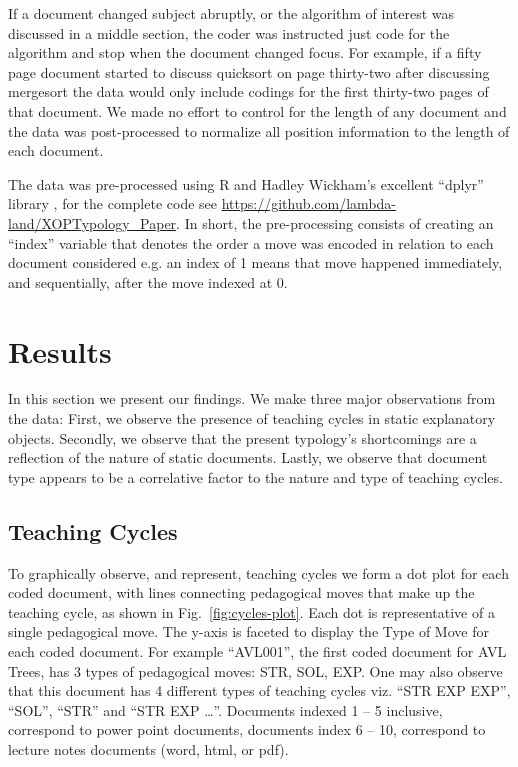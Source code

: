 \documentclass[conference]{IEEEtran}
\begin{document}
If a document changed subject abruptly, or the algorithm of interest was
discussed in a middle section, the coder was instructed just code for the
algorithm and stop when the document changed focus. For example, if a fifty page
document started to discuss quicksort on page thirty-two after discussing
mergesort the data would only include codings for the first thirty-two pages of
that document. We made no effort to control for the length of any document and
the data was post-processed to normalize all position information to the
length of each document.

The data was pre-processed using R and Hadley Wickham's excellent ``dplyr''
library \cite{Dplyr}, for the complete code see
\url{https://github.com/lambda-land/XOPTypology_Paper}. In short, the
pre-processing consists of creating an ``index'' variable that denotes the order
a move was encoded in relation to each document considered e.g. an index of 1
means that move happened immediately, and sequentially, after the move indexed
at 0.


\section{Results}

In this section we present our findings. We make three major observations from
the data: First, we observe the presence of teaching cycles in static
explanatory objects. Secondly, we observe that the present typology's
shortcomings are a reflection of the nature of static documents. Lastly, we
observe that document type appears to be a correlative factor to
the nature and type of teaching cycles.


\subsection{Teaching Cycles}
\label{sec:res:cycles}

To graphically observe, and represent, teaching cycles we form a dot plot for
each coded document, with lines connecting pedagogical moves that make up the
teaching cycle, as shown in Fig.~\ref{fig:cycles-plot}.
%
Each dot is representative of a single pedagogical move. The y-axis is faceted to display
the Type of Move for each coded document. For example ``AVL001'', the first
coded document for AVL Trees, has 3 types of pedagogical moves: STR, SOL, EXP.
One may also observe that this document has 4 different types of teaching cycles
viz. ``STR EXP EXP'', ``SOL'', ``STR'' and ``STR EXP \ldots''. Documents
indexed 1 -- 5 inclusive, correspond to power point documents, documents index 6
-- 10, correspond to lecture notes documents (word, html, or pdf).
\end{document}

